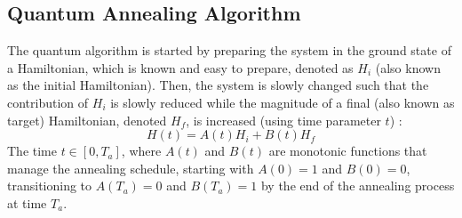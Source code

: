\subsection{Quantum Annealing Algorithm}

The quantum algorithm is started by preparing the system in the ground state of a Hamiltonian,
which is known and easy to prepare, denoted as $H_i$ (also known as the initial Hamiltonian). Then,
the system is slowly changed such that the contribution of $H_i$ is slowly reduced while the magnitude
of a final (also known as target) Hamiltonian, denoted $H_f$, is increased (using time parameter $t$)  \cite{Tanaka2017QuantumSG}:
\begin{equation}
H(t) = A(t) H_i + B(t) H_f
\end{equation}
The time $t \in [0, T_a]$, where \( A(t) \) and \( B(t) \) are monotonic functions that manage the annealing schedule, starting with \( A(0) = 1 \) and \( B(0) = 0 \), transitioning to \( A(T_a) = 0 \) and \( B(T_a) = 1 \) by the end of the annealing process at time \( T_a \).

